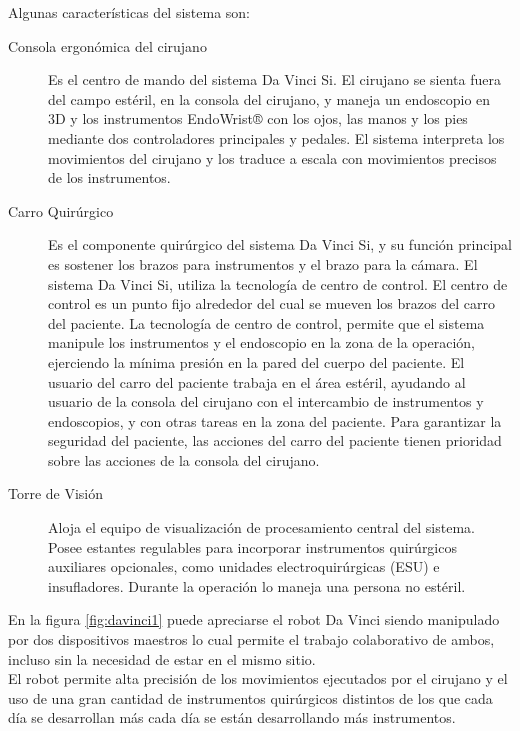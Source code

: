 Algunas características del sistema son:
\begin{description}


\item[Consola ergonómica del cirujano]
Es el centro de mando del sistema Da Vinci Si. El cirujano se sienta fuera del campo estéril, en la consola del cirujano, y maneja un endoscopio en 3D y los instrumentos EndoWrist® con los ojos, las manos y los pies mediante dos controladores principales y pedales. El sistema interpreta los movimientos del cirujano y los traduce a escala con movimientos precisos de los instrumentos.

\item[Carro Quirúrgico]
Es el componente quirúrgico del sistema Da Vinci Si, y su función principal es sostener los brazos para instrumentos y el brazo para la cámara. El sistema Da Vinci Si, utiliza la tecnología de centro de control. El centro de control es un punto fijo alrededor del cual se mueven los brazos del carro del paciente. La tecnología de centro de control, permite que el sistema manipule los instrumentos y el endoscopio en la zona de la operación, ejerciendo la mínima presión en la pared del cuerpo del paciente. El usuario del carro del paciente trabaja en el área estéril, ayudando al usuario de la consola del cirujano con el intercambio de instrumentos y endoscopios, y con otras tareas en la zona del paciente. Para garantizar la seguridad del paciente, las acciones del carro del paciente tienen prioridad sobre las acciones de la consola del cirujano.

\item[Torre de Visión]
Aloja el equipo de visualización de procesamiento central del sistema. Posee estantes regulables para incorporar instrumentos quirúrgicos auxiliares opcionales, como unidades electroquirúrgicas (ESU) e insufladores. Durante la operación lo maneja una persona no estéril.


\end{description}



En la figura \ref{fig:davinci1} puede apreciarse  el robot Da Vinci siendo manipulado por dos dispositivos maestros lo cual permite el trabajo colaborativo de ambos, incluso sin la necesidad de estar en el mismo sitio.\\

El robot permite alta precisión de los movimientos ejecutados por el cirujano y el uso de una gran cantidad de instrumentos quirúrgicos distintos de los que cada día se desarrollan más cada día se están desarrollando más instrumentos.\\

